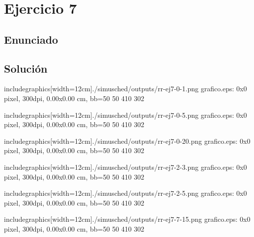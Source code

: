\section{Ejercicio 7}
\subsection{Enunciado}

\subsection{Soluci\'on}


\begin {center}
includegraphics[width=12cm]{./simusched/outputs/rr-ej7-0-1.png}
grafico.eps: 0x0 pixel, 300dpi, 0.00x0.00 cm, bb=50 50 410 302
\end {center}

\begin {center}
includegraphics[width=12cm]{./simusched/outputs/rr-ej7-0-5.png}
grafico.eps: 0x0 pixel, 300dpi, 0.00x0.00 cm, bb=50 50 410 302
\end {center}

\begin {center}
includegraphics[width=12cm]{./simusched/outputs/rr-ej7-0-20.png}
grafico.eps: 0x0 pixel, 300dpi, 0.00x0.00 cm, bb=50 50 410 302
\end {center}


\begin {center}
includegraphics[width=12cm]{./simusched/outputs/rr-ej7-2-3.png}
grafico.eps: 0x0 pixel, 300dpi, 0.00x0.00 cm, bb=50 50 410 302
\end {center}

\begin {center}
includegraphics[width=12cm]{./simusched/outputs/rr-ej7-2-5.png}
grafico.eps: 0x0 pixel, 300dpi, 0.00x0.00 cm, bb=50 50 410 302
\end {center}

\begin {center}
includegraphics[width=12cm]{./simusched/outputs/rr-ej7-7-15.png}
grafico.eps: 0x0 pixel, 300dpi, 0.00x0.00 cm, bb=50 50 410 302
\end {center}
